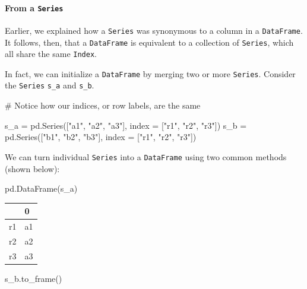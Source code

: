 \documentclass[
  letterpaper,
  DIV=11,
  numbers=noendperiod]{scrreprt}
\let\oldparagraph\paragraph
\renewcommand{\paragraph}[1]{\oldparagraph{#1}\mbox{}}
\newenvironment{Shaded}{\begin{snugshade}}{\end{snugshade}}
\newcommand{\CommentTok}[1]{\textcolor[rgb]{0.37,0.37,0.37}{#1}}
\newcommand{\NormalTok}[1]{\textcolor[rgb]{0.00,0.23,0.31}{#1}}
\newcommand{\OperatorTok}[1]{\textcolor[rgb]{0.37,0.37,0.37}{#1}}
\newcommand{\StringTok}[1]{\textcolor[rgb]{0.13,0.47,0.30}{#1}}
\begin{document}
\paragraph{\texorpdfstring{From a
\texttt{Series}}{From a Series}}\label{from-a-series}

Earlier, we explained how a \texttt{Series} was synonymous to a column
in a \texttt{DataFrame}. It follows, then, that a \texttt{DataFrame} is
equivalent to a collection of \texttt{Series}, which all share the same
\texttt{Index}.

In fact, we can initialize a \texttt{DataFrame} by merging two or more
\texttt{Series}. Consider the \texttt{Series} \texttt{s\_a} and
\texttt{s\_b}.

\begin{Shaded}
\begin{Highlighting}[]
\CommentTok{\# Notice how our indices, or row labels, are the same}

\NormalTok{s\_a }\OperatorTok{=}\NormalTok{ pd.Series([}\StringTok{"a1"}\NormalTok{, }\StringTok{"a2"}\NormalTok{, }\StringTok{"a3"}\NormalTok{], index }\OperatorTok{=}\NormalTok{ [}\StringTok{"r1"}\NormalTok{, }\StringTok{"r2"}\NormalTok{, }\StringTok{"r3"}\NormalTok{])}
\NormalTok{s\_b }\OperatorTok{=}\NormalTok{ pd.Series([}\StringTok{"b1"}\NormalTok{, }\StringTok{"b2"}\NormalTok{, }\StringTok{"b3"}\NormalTok{], index }\OperatorTok{=}\NormalTok{ [}\StringTok{"r1"}\NormalTok{, }\StringTok{"r2"}\NormalTok{, }\StringTok{"r3"}\NormalTok{])}
\end{Highlighting}
\end{Shaded}

We can turn individual \texttt{Series} into a \texttt{DataFrame} using
two common methods (shown below):

\begin{Shaded}
\begin{Highlighting}[]
\NormalTok{pd.DataFrame(s\_a)}
\end{Highlighting}
\end{Shaded}

\begin{longtable}[]{@{}ll@{}}
\toprule\noalign{}
& 0 \\
\midrule\noalign{}
\endhead
\bottomrule\noalign{}
\endlastfoot
r1 & a1 \\
r2 & a2 \\
r3 & a3 \\
\end{longtable}

\begin{Shaded}
\begin{Highlighting}[]
\NormalTok{s\_b.to\_frame()}
\end{Highlighting}
\end{Shaded}
\end{document}
